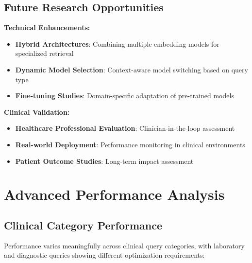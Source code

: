 \subsection{Future Research Opportunities}

\textbf{Technical Enhancements:}
\begin{itemize}
    \item \textbf{Hybrid Architectures}: Combining multiple embedding models for specialized retrieval
    \item \textbf{Dynamic Model Selection}: Context-aware model switching based on query type
    \item \textbf{Fine-tuning Studies}: Domain-specific adaptation of pre-trained models
\end{itemize}

\textbf{Clinical Validation:}
\begin{itemize}
    \item \textbf{Healthcare Professional Evaluation}: Clinician-in-the-loop assessment
    \item \textbf{Real-world Deployment}: Performance monitoring in clinical environments
    \item \textbf{Patient Outcome Studies}: Long-term impact assessment
\end{itemize}

\section{Advanced Performance Analysis}

\subsection{Clinical Category Performance}


Performance varies meaningfully across clinical query categories, with laboratory and diagnostic queries showing different optimization requirements:

